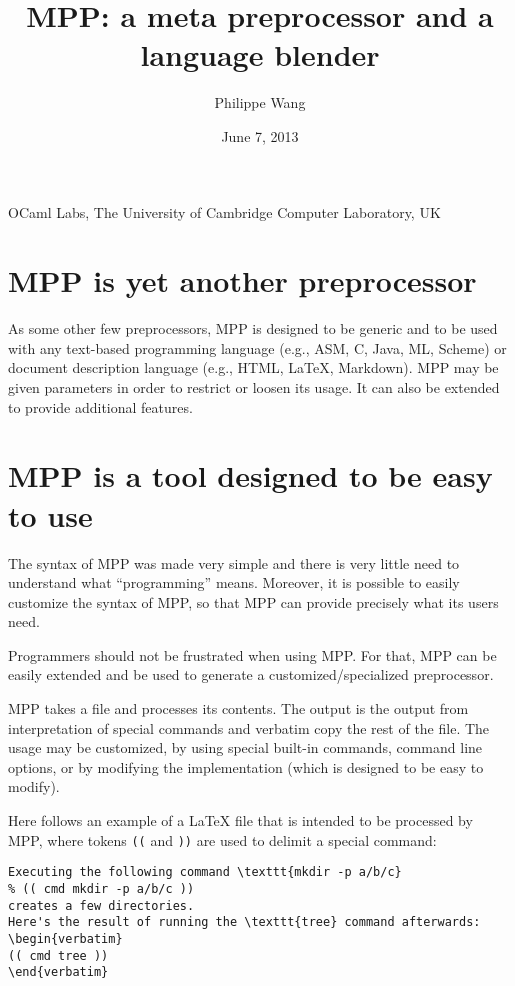 \documentclass[a4paper]{article}
\title{MPP: a meta preprocessor and a language blender}
\author{Philippe Wang}
\date{June 7, 2013}
\begin{document}
\maketitle
\begin{center}
  OCaml Labs, 
  The University of Cambridge Computer Laboratory, UK\\
\end{center}
\section{MPP is yet another preprocessor}
As some other few preprocessors, MPP
is  designed  to  be  generic  and  to be  used  with  any  text-based
programming  language (e.g.,  ASM, C,  Java, ML,  Scheme)  or document
description language  (e.g., HTML, LaTeX, Markdown). MPP  may be given
parameters in  order to restrict or  loosen its usage. It  can also be
extended to provide additional features.

\section{MPP is a tool designed to be easy to use}

The syntax of MPP was made very simple and there is very little need
to understand what ``programming'' means.  Moreover, it is possible to
easily customize the syntax of MPP, so that MPP can provide precisely
what its users need.

Programmers should not be frustrated when using MPP. For that, MPP can
be easily  extended and be  used to generate  a customized/specialized
preprocessor.

MPP takes a file and processes its contents.  The output is the output
from interpretation of special commands  and verbatim copy the rest of
the  file.  The  usage may  be customized,  by using  special built-in
commands,  command line  options, or  by modifying  the implementation
(which is designed to be easy to modify).

Here  follows an  example  of a  LaTeX  file that  is  intended to  be
processed by MPP, where tokens \texttt{((} and \texttt{))} are used to
delimit a special command:
\begin{lstlisting}
Executing the following command \texttt{mkdir -p a/b/c} 
% (( cmd mkdir -p a/b/c ))
creates a few directories.
Here's the result of running the \texttt{tree} command afterwards:
\begin{verbatim}
(( cmd tree ))
\end{verbatim}
\end{lstlisting}
\end{document}
